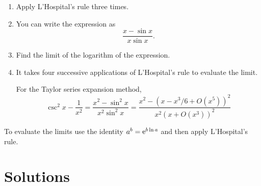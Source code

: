 \begin{Hint}
  \label{hint first derivative higher}
\end{Hint}








\begin{Hint}
  \label{hint lim (x - sin x)/x3}
  \renewcommand{\theenumi}{\alph{enumi}}
  \begin{enumerate}
  \item
    Apply L'Hospital's rule three times.
  \item
    You can write the expression as
    \[
    \frac{x - \sin x}{x \sin x}.
    \]
  \item
    Find the limit of the logarithm of the expression.
  \item
    It takes four successive applications of L'Hospital's rule to evaluate
    the limit.

    For the Taylor series expansion method,
    \[
    \csc^2 x - \frac{1}{x^2} 
    = \frac{x^2 - \sin^2 x}{ x^2 \sin^2 x } 
    = \frac{x^2 - (x - x^3/6 + O(x^5))^2}
    { x^2 (x + O(x^3))^2 } 
    \]
  \end{enumerate}
  \renewcommand{\theenumi}{\arabic{enumi}}
\end{Hint}







\begin{Hint}
  \label{hint lim x a/x}
  To evaluate the limits use the identity $a^b = \mathop{\mathrm{e}}\nolimits^{b \ln a}$
  and then apply L'Hospital's rule.
\end{Hint}
















\raggedbottom
\pagebreak
\flushbottom
\section{Solutions}


